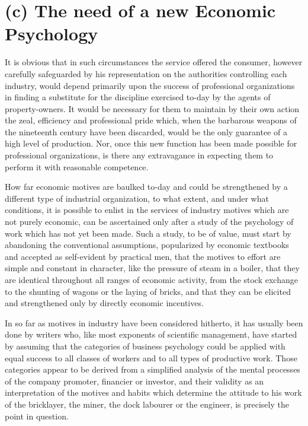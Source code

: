 \documentclass{book}
\begin{document}
\section{(c) The need of a new Economic Psychology}
It is obvious that in such circumstances the service offered the consumer, however carefully safeguarded by his representation on the authorities controlling each industry, would depend primarily upon the success of professional organizations in finding a substitute for the discipline exercised to-day by the agents of property-owners. It would be necessary for them to maintain by their own action the zeal, efficiency and professional pride which, when the barbarous weapons of the nineteenth century have been discarded, would be the only guarantee of a high level of production. Nor, once this new function has been made possible for professional organizations, is there any extravagance in expecting them to perform it with reasonable competence.

How far economic motives are baulked to-day and could be strengthened by a different type of industrial organization, to what extent, and under what conditions, it is possible to enlist in the services of industry motives which are not purely economic, can be ascertained only after a study of the psychology of work which has not yet been made. Such a study, to be of value, must start by abandoning the conventional assumptions, popularized by economic textbooks and accepted as self-evident by practical men, that the motives to effort are simple and constant in character, like the pressure of steam in a boiler, that they are identical throughout all ranges of economic activity, from the stock exchange to the shunting of wagons or the laying of bricks, and that they can be elicited and strengthened only by directly economic incentives.

In so far as motives in industry have been considered hitherto, it has usually been done by writers who, like most exponents of scientific management, have started by assuming that the categories of business psychology could be applied with equal success to all classes of workers and to all types of productive work. Those categories appear to be derived from a simplified analysis of the mental processes of the company promoter, financier or investor, and their validity as an interpretation of the motives and habits which determine the attitude to his work of the bricklayer, the miner, the dock labourer or the engineer, is precisely the point in question.
\end{document}
